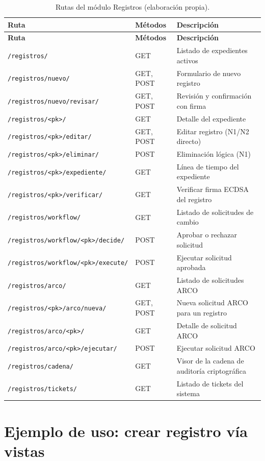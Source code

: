\documentclass[10pt,letterpaper]{report}
\begin{document}
\begin{longtable}{l l p{4.5cm}}
\caption{Rutas del módulo Registros (elaboración propia).}
\label{tab:routes_reg}\\
\toprule
\textbf{Ruta} & \textbf{Métodos} & \textbf{Descripción} \\
\midrule
\endfirsthead
\toprule
\textbf{Ruta} & \textbf{Métodos} & \textbf{Descripción} \\
\midrule
\endhead
\bottomrule
\endfoot
\texttt{/registros/} & GET & Listado de expedientes activos \\
\texttt{/registros/nuevo/} & GET, POST & Formulario de nuevo registro \\
\texttt{/registros/nuevo/revisar/} & GET, POST & Revisión y confirmación con firma \\
\texttt{/registros/<pk>/} & GET & Detalle del expediente \\
\texttt{/registros/<pk>/editar/} & GET, POST & Editar registro (N1/N2 directo) \\
\texttt{/registros/<pk>/eliminar/} & POST & Eliminación lógica (N1) \\
\texttt{/registros/<pk>/expediente/} & GET & Línea de tiempo del expediente \\
\texttt{/registros/<pk>/verificar/} & GET & Verificar firma ECDSA del registro \\
\texttt{/registros/workflow/} & GET & Listado de solicitudes de cambio \\
\texttt{/registros/workflow/<pk>/decide/} & POST & Aprobar o rechazar solicitud \\
\texttt{/registros/workflow/<pk>/execute/} & POST & Ejecutar solicitud aprobada \\
\texttt{/registros/arco/} & GET & Listado de solicitudes ARCO \\
\texttt{/registros/<pk>/arco/nueva/} & GET, POST & Nueva solicitud ARCO para un registro \\
\texttt{/registros/arco/<pk>/} & GET & Detalle de solicitud ARCO \\
\texttt{/registros/arco/<pk>/ejecutar/} & POST & Ejecutar solicitud ARCO \\
\texttt{/registros/cadena/} & GET & Visor de la cadena de auditoría criptográfica \\
\texttt{/registros/tickets/} & GET & Listado de tickets del sistema \\
\end{longtable}

\section{Ejemplo de uso: crear registro vía vistas}
\end{document}
